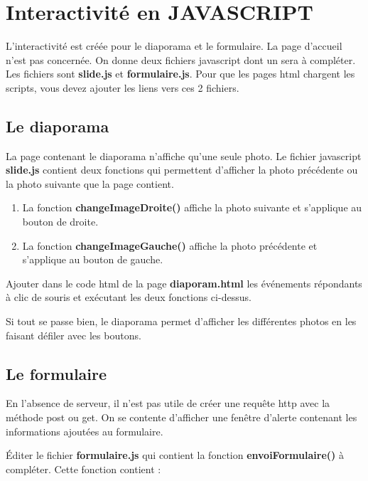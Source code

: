 \documentclass[11pt]{article}
\providecommand{\tightlist}{%
      \setlength{\itemsep}{0pt}\setlength{\parskip}{0pt}}
\begin{document}
    \hypertarget{interactivituxe9-en-javascript}{%
\section{Interactivité en
JAVASCRIPT}\label{interactivituxe9-en-javascript}}

L'interactivité est créée pour le diaporama et le formulaire. La page
d'accueil n'est pas concernée. On donne deux fichiers javascript dont un
sera à compléter. Les fichiers sont \textbf{slide.js} et
\textbf{formulaire.js}. Pour que les pages html chargent les scripts,
vous devez ajouter les liens vers ces 2 fichiers.

\hypertarget{le-diaporama}{%
\subsection{Le diaporama}\label{le-diaporama}}

La page contenant le diaporama n'affiche qu'une seule photo. Le fichier
javascript \textbf{slide.js} contient deux fonctions qui permettent
d'afficher la photo précédente ou la photo suivante que la page
contient.

\begin{enumerate}
\def\labelenumi{\arabic{enumi}.}
\tightlist
\item
  La fonction \textbf{changeImageDroite()} affiche la photo suivante et
  s'applique au bouton de droite.
\item
  La fonction \textbf{changeImageGauche()} affiche la photo précédente
  et s'applique au bouton de gauche.
\end{enumerate}

Ajouter dans le code html de la page \textbf{diaporam.html} les
événements répondants à clic de souris et exécutant les deux fonctions
ci-dessus.

Si tout se passe bien, le diaporama permet d'afficher les différentes
photos en les faisant défiler avec les boutons.

\hypertarget{le-formulaire}{%
\subsection{Le formulaire}\label{le-formulaire}}

En l'absence de serveur, il n'est pas utile de créer une requête http
avec la méthode post ou get. On se contente d'afficher une fenêtre
d'alerte contenant les informations ajoutées au formulaire.

Éditer le fichier \textbf{formulaire.js} qui contient la fonction
\textbf{envoiFormulaire()} à compléter. Cette fonction contient :
\end{document}
